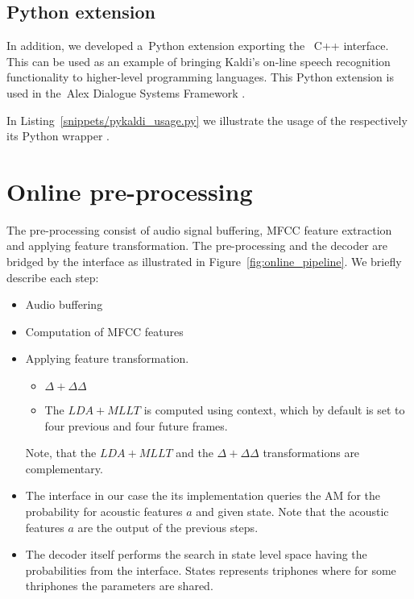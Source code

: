 \subsection{Python extension}



In addition, we developed a~Python extension exporting the~ C++ interface.
This can be used as an example of bringing Kaldi's on-line speech recognition functionality to higher-level programming languages.
This Python extension is used in the~Alex Dialogue Systems Framework \cite{asdf2014url}.

In Listing~\ref{snippets/pykaldi_usage.py} we illustrate the usage of the 
respectively its Python wrapper .


\section{Online pre-processing} 
\label{sec:onl_preprocess}
The pre-processing consist of audio signal buffering, \ac{MFCC} feature extraction and
applying feature transformation. 
The pre-processing and the decoder are bridged by the  
interface as illustrated in Figure~\ref{fig:online_pipeline}.
We briefly describe each step:
\begin{itemize}
    \item Audio buffering
    \item Computation of \ac{MFCC} features
    \item Applying feature transformation. 
        \begin{itemize}
            \item $\Delta + \Delta\Delta$ 
            \item The $LDA+MLLT$ is computed using context,
                which by default is set to four previous and four future frames.
        \end{itemize}
        Note, that the $LDA+MLLT$ and the $\Delta+\Delta\Delta$ transformations are complementary.
    \item The  interface in our case the its  implementation
        queries the \ac{AM} for the probability for acoustic features $a$ and given state.
        Note that the acoustic features $a$ are the output of the previous steps.
    \item The decoder itself performs the search in state level space 
        having the probabilities from the  interface. 
        States represents triphones where for some thriphones the parameters are shared.
\end{itemize}


